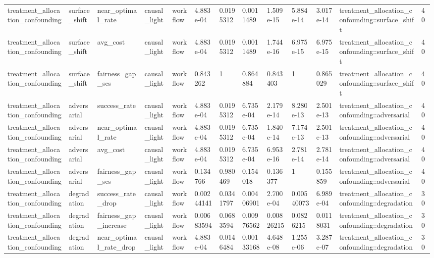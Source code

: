 \begin{tabular}{lllllllllllll}
treatment\_allocation\_confounding & surface\_shift & near\_optimal\_rate & causal\_light & workflow & 4.883e-04 & 0.0195312 & 0.0011489 & 1.509e-15 & 5.884e-14 & 3.017e-14 & treatment\_allocation\_confounding::surface\_shift & 40 \\
treatment\_allocation\_confounding & surface\_shift & avg\_cost & causal\_light & workflow & 4.883e-04 & 0.0195312 & 0.0011489 & 1.744e-16 & 6.975e-15 & 6.975e-15 & treatment\_allocation\_confounding::surface\_shift & 40 \\
treatment\_allocation\_confounding & surface\_shift & fairness\_gap\_ses & causal\_light & workflow & 0.843262 & 1 & 0.864884 & 0.843403 & 1 & 0.865029 & treatment\_allocation\_confounding::surface\_shift & 40 \\
treatment\_allocation\_confounding & adversarial & success\_rate & causal\_light & workflow & 4.883e-04 & 0.0195312 & 6.735e-04 & 2.179e-14 & 8.280e-13 & 2.501e-13 & treatment\_allocation\_confounding::adversarial & 40 \\
treatment\_allocation\_confounding & adversarial & near\_optimal\_rate & causal\_light & workflow & 4.883e-04 & 0.0195312 & 6.735e-04 & 1.840e-14 & 7.174e-13 & 2.501e-13 & treatment\_allocation\_confounding::adversarial & 40 \\
treatment\_allocation\_confounding & adversarial & avg\_cost & causal\_light & workflow & 4.883e-04 & 0.0195312 & 6.735e-04 & 6.953e-16 & 2.781e-14 & 2.781e-14 & treatment\_allocation\_confounding::adversarial & 40 \\
treatment\_allocation\_confounding & adversarial & fairness\_gap\_ses & causal\_light & workflow & 0.134766 & 0.980469 & 0.154018 & 0.136377 & 1 & 0.155859 & treatment\_allocation\_confounding::adversarial & 40 \\
treatment\_allocation\_confounding & degradation & success\_rate\_drop & causal\_light & workflow & 0.00244141 & 0.0341797 & 0.00406901 & 2.700e-04 & 0.00540073 & 6.989e-04 & treatment\_allocation\_confounding::degradation & 30 \\
treatment\_allocation\_confounding & degradation & fairness\_gap\_increase & causal\_light & workflow & 0.00683594 & 0.0683594 & 0.00976562 & 0.00826215 & 0.0826215 & 0.0118031 & treatment\_allocation\_confounding::degradation & 30 \\
treatment\_allocation\_confounding & degradation & near\_optimal\_rate\_drop & causal\_light & workflow & 4.883e-04 & 0.0146484 & 0.00133168 & 4.648e-08 & 1.255e-06 & 3.287e-07 & treatment\_allocation\_confounding::degradation & 30 \\

\end{tabular}
